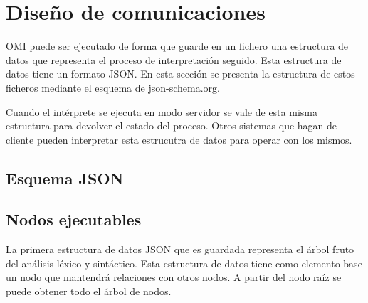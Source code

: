 \section{Diseño de comunicaciones}
OMI puede ser ejecutado de forma que guarde en un fichero una estructura de datos que representa el proceso de interpretación seguido. 
Esta estructura de datos tiene un formato JSON. En esta sección se presenta la estructura de estos ficheros mediante el esquema de 
json-schema.org.

Cuando el intérprete se ejecuta en modo servidor se vale de esta misma estructura para devolver el estado del proceso. Otros sistemas
que hagan de cliente pueden interpretar esta estrucutra de datos para operar con los mismos. 
\subsection{Esquema JSON}

\subsection{Nodos ejecutables}
La primera estructura de datos JSON que es guardada representa el árbol fruto del análisis léxico y sintáctico. Esta estructura de datos tiene como elemento
base un nodo que mantendrá relaciones con otros nodos. A partir del nodo raíz se puede obtener todo el árbol de nodos.



